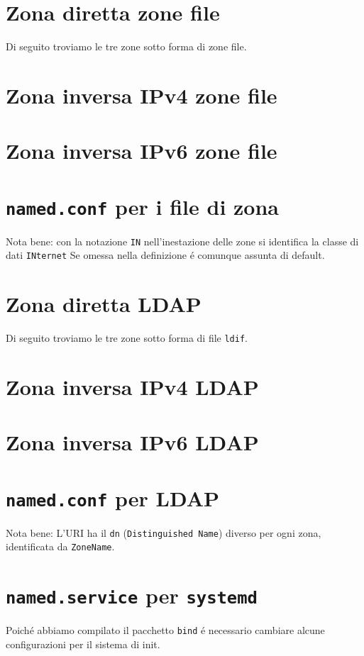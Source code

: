 \documentclass[9pt, a4paper, oneside]{article}
\begin{document}
		\section{Zona diretta zone file}
			\par
				Di seguito troviamo le tre zone sotto forma di 
				zone file.
			\texttt{}
			\newpage
		\section{Zona inversa IPv4 zone file}
			\texttt{}
			\newpage
		\section{Zona inversa IPv6 zone file}
			\texttt{}
			\newpage
		\section{\texttt{named.conf} per i file di zona}
			\par
				Nota bene: con la notazione \texttt{IN} 
				nell'inestazione delle zone si identifica la 
				classe di dati \texttt{INternet}
				Se omessa nella definizione \'e comunque 
				assunta di default.
			\texttt{}
			\newpage
		\section{Zona diretta LDAP}
			\par
				Di seguito troviamo le tre zone sotto forma di 
				file \texttt{ldif}.
			\texttt{}
			\newpage
		\section{Zona inversa IPv4 LDAP}
			\texttt{}
			\newpage
		\section{Zona inversa IPv6 LDAP}
			\texttt{}
			\newpage
		\section{\texttt{named.conf} per LDAP}
			\par
				Nota bene: L'URI ha il \texttt{dn} 
				(\texttt{Distinguished Name}) diverso per ogni 
				zona, identificata da \texttt{ZoneName}.
			\texttt{}
			\newpage
		\section{\texttt{named.service} per \texttt{systemd}}
			\par
				Poich\'e abbiamo compilato il pacchetto 
				\texttt{bind} \'e necessario cambiare alcune 
				configurazioni per il sistema di init.
			\texttt{}
\end{document}
